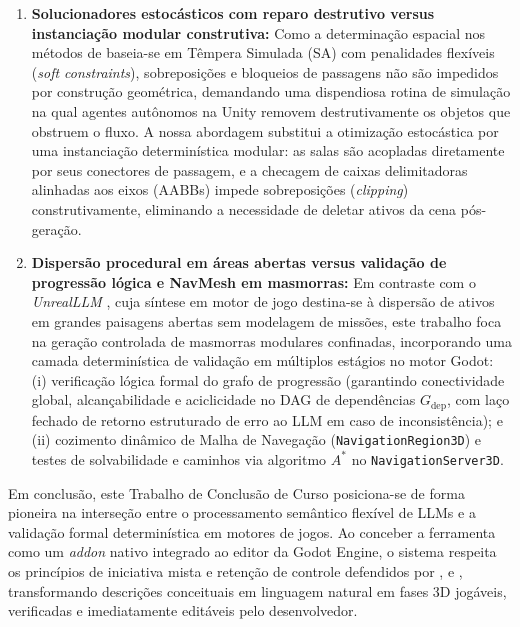 \begin{enumerate}
    \item \textbf{Solucionadores estocásticos com reparo destrutivo versus instanciação modular construtiva:} Como a determinação espacial nos métodos de \textcite{xu2025databasedrivenframework3dlevel, xu2025constraint} baseia-se em Têmpera Simulada (SA) com penalidades flexíveis (\textit{soft constraints}), sobreposições e bloqueios de passagens não são impedidos por construção geométrica, demandando uma dispendiosa rotina de simulação na qual agentes autônomos na Unity removem destrutivamente os objetos que obstruem o fluxo. A nossa abordagem substitui a otimização estocástica por uma instanciação determinística modular: as salas são acopladas diretamente por seus conectores de passagem, e a checagem de caixas delimitadoras alinhadas aos eixos (AABBs) impede sobreposições (\textit{clipping}) construtivamente, eliminando a necessidade de deletar ativos da cena pós-geração.
    
    \item \textbf{Dispersão procedural em áreas abertas versus validação de progressão lógica e NavMesh em masmorras:} Em contraste com o \textit{UnrealLLM} \cite{tang2025unrealllm}, cuja síntese em motor de jogo destina-se à dispersão de ativos em grandes paisagens abertas sem modelagem de missões, este trabalho foca na geração controlada de masmorras modulares confinadas, incorporando uma camada determinística de validação em múltiplos estágios no motor Godot: (i) verificação lógica formal do grafo de progressão (garantindo conectividade global, alcançabilidade e aciclicidade no DAG de dependências $G_{\text{dep}}$, com laço fechado de retorno estruturado de erro ao LLM em caso de inconsistência); e (ii) cozimento dinâmico de Malha de Navegação (\texttt{NavigationRegion3D}) e testes de solvabilidade e caminhos via algoritmo $A^*$ no \texttt{NavigationServer3D}.
\end{enumerate}

Em conclusão, este Trabalho de Conclusão de Curso posiciona-se de forma pioneira na interseção entre o processamento semântico flexível de LLMs e a validação formal determinística em motores de jogos. Ao conceber a ferramenta como um \textit{addon} nativo integrado ao editor da Godot Engine, o sistema respeita os princípios de iniciativa mista e retenção de controle defendidos por \textcite{lai2020towards}, \textcite{walton2020evaluating} e \textcite{bandeali2026generative}, transformando descrições conceituais em linguagem natural em fases 3D jogáveis, verificadas e imediatamente editáveis pelo desenvolvedor.
